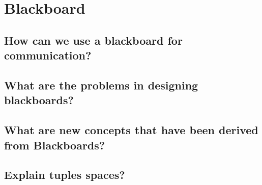 \section{Blackboard}
\subsection{How can we use a blackboard for communication?}
\subsection{What are the problems in designing blackboards?}
\subsection{What are new concepts that have been derived from Blackboards?}
\subsection{Explain tuples spaces?}

